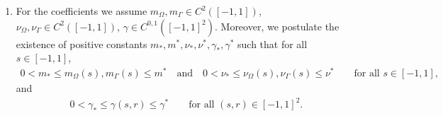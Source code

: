 \documentclass[10pt,reqno]{amsart}
\theoremstyle{remark}
\numberwithin{equation}{section}
\newcommand{\Om}{\Omega}
\newcommand{\Ga}{\Gamma}
\begin{document}
\begin{enumerate}[label=\textnormal{\bfseries(A\arabic*)}]
    \item \label{Assumption:Coefficients} For the coefficients we assume $m_\Om, m_\Ga\in C^2([-1,1])$, $\nu_\Om, \nu_\Ga\in C^2([-1,1])$, $\gamma\in C^{0,1}([-1,1]^2)$. Moreover, we postulate the existence of positive constants $m_\ast,m^\ast,\nu_\ast,\nu^\ast,\gamma_\ast,\gamma^\ast$ such that for all $s\in[-1,1]$,
    \begin{align}\label{Assumption:Mobility:Bound}
        0 < m_\ast \leq m_\Om(s), m_\Ga(s) \leq m^\ast \quad\text{and}\quad 0 < \nu_\ast \leq \nu_\Om(s), \nu_\Ga(s) \leq \nu^\ast \qquad\text{for all~}s\in[-1,1],
    \end{align}
    and
    \begin{align*}
    	0 < \gamma_\ast \leq \gamma(s,r) \leq \gamma^\ast \qquad\text{for all~}(s,r)\in[-1,1]^2.
    \end{align*}
    

\end{enumerate}
\end{document}
